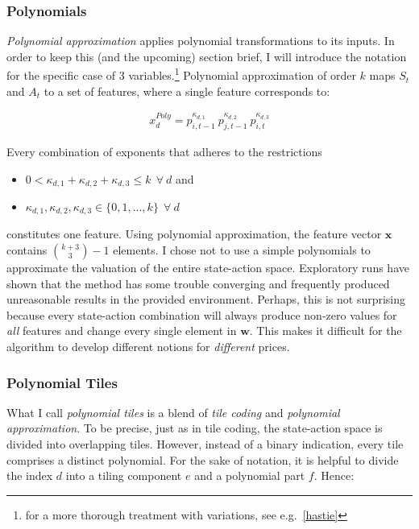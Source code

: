\subsubsection{Polynomials}\label{polynomial}

\emph{Polynomial approximation} applies polynomial transformations to its inputs. In order to keep this (and the upcoming) section brief, I will introduce the notation for the specific case of 3 variables.\footnote{for a more thorough treatment with variations, see e.g.\ \autoref{hastie}} Polynomial approximation of order $k$ maps $S_t$ and $A_t$ to a set of features, where a single feature corresponds to:


\begin{gather}\label{polynomial_extraction}
x_d^{Poly} = p_{i, t-1}^{\kappa_{d,1}} ~ p_{j, t-1}^{\kappa_{d,2}} ~ p_{i, t}^{\kappa_{d,3}}
\end{gather}


Every combination of exponents that adheres to the restrictions

\begin{itemize}
	\item $0 < \kappa_{d,1} + \kappa_{d,2} + \kappa_{d,3} \leq k  ~~ \forall ~ d$ and
	\item $\kappa_{d,1}, \kappa_{d,2}, \kappa_{d,3} \in \{0, 1, ..., k\} ~~  \forall ~ d$
\end{itemize}

constitutes one feature. Using polynomial approximation, the feature vector $\boldsymbol{x}$ contains ${k + 3\choose3}  - 1$ elements. I chose not to use a simple polynomials to approximate the valuation of the entire state-action space. Exploratory runs have shown that the method has some trouble converging and frequently produced unreasonable results in the provided environment. Perhaps, this is not surprising because every state-action combination will always produce non-zero values for \emph{all} features and change every single element in $\boldsymbol{w}$. This makes it difficult for the algorithm to develop different notions for \emph{different} prices.

\subsubsection{Polynomial Tiles}

What I call \emph{polynomial tiles} is a blend of \emph{tile coding} and \emph{polynomial approximation}. To be precise, just as in tile coding, the state-action space is divided into overlapping tiles. However, instead of a binary indication, every tile comprises a distinct polynomial. For the sake of notation, it is helpful to divide the index $d$ into a tiling component $e$ and a polynomial part $f$.  Hence:

